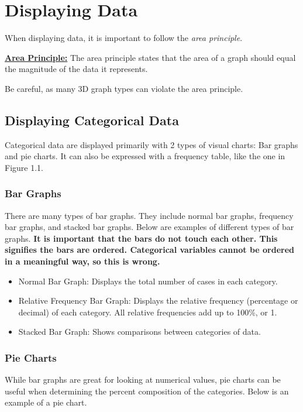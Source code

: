 \section{Displaying Data}
When displaying data, it is important to follow the \emph{area principle}.

\begin{mdframed}
  \begin{definition}{\textbf{\underline{Area Principle:}}}
    The area principle states that the area of a graph should equal the 
    magnitude of the data it represents.
  \end{definition}
\end{mdframed}
Be careful, as many 3D graph types can violate the area principle.

\subsection{Displaying Categorical Data}
Categorical data are displayed primarily with 2 types of visual charts: Bar graphs and pie charts. It can
also be expressed with a frequency table, like the one in Figure 1.1.





\subsubsection{Bar Graphs}
There are many types of bar graphs. They include normal bar graphs, frequency bar graphs, and stacked
bar graphs. Below are examples of different types of bar graphs. \textbf{It is important
that the bars do not touch each other. This signifies the bars are ordered. Categorical
variables cannot be ordered in a meaningful way, so this is wrong.}
\begin{itemize}
  \item Normal Bar Graph: Displays the total number of cases in each category.
  \item Relative Frequency Bar Graph: Displays the relative frequency (percentage or decimal)
of each category. All relative frequencies add up to 100\%, or 1.
  \item Stacked Bar Graph: Shows comparisons between categories of data.
\end{itemize}




\clearpage

\subsubsection{Pie Charts}
While bar graphs are great for looking at numerical values, pie charts can 
be useful when determining the percent composition of the categories. Below
is an example of a pie chart. 

